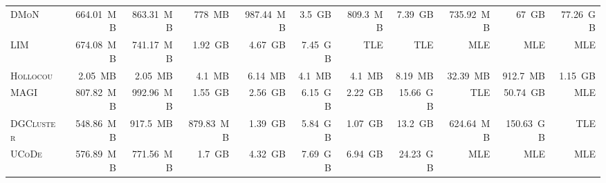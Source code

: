 \documentclass[../paper.tex]{subfiles}
\begin{document}
\begin{table}[H]
\begin{tabular}{l|rrrrrrrrrr}
        \textsc{DMoN}      & 664.01~MB & 863.31~MB & 778~MB    & 987.44~MB & 3.5~GB    & 809.3~MB  & 7.39~GB     & 735.92~MB  & 67~GB     & 77.26~GB  \\
        \textsc{LIM}       & 674.08~MB & 741.17~MB & 1.92~GB   & 4.67~GB   & 7.45~GB   & TLE       & TLE         & MLE        & MLE       & MLE       \\
        \textsc{Hollocou}  & 2.05~MB   & 2.05~MB   & 4.1~MB    & 6.14~MB   & 4.1~MB    & 4.1~MB    & 8.19~MB     & 32.39~MB   & 912.7~MB  & 1.15~GB   \\
        \textsc{MAGI}      & 807.82~MB & 992.96~MB & 1.55~GB   & 2.56~GB   & 6.15~GB   & 2.22~GB   & 15.66~GB    & TLE        & 50.74~GB  & MLE       \\
        \textsc{DGCluster} & 548.86~MB & 917.5~MB  & 879.83~MB & 1.39~GB   & 5.84~GB   & 1.07~GB   & 13.2~GB     & 624.64~MB  & 150.63~GB & TLE       \\
        \textsc{UCoDe}     & 576.89~MB & 771.56~MB & 1.7~GB    & 4.32~GB   & 7.69~GB   & 6.94~GB   & 24.23~GB    & MLE        & MLE       & MLE       \\
        \bottomrule
    \end{tabular}
\end{table}

\ifSubfilesClassLoaded{%
}{}
\end{document}
